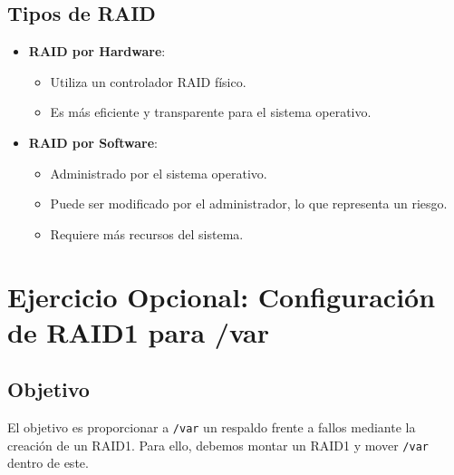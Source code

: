 \subsection{Tipos de RAID}
\begin{itemize}
    \item \textbf{RAID por Hardware}: 
    \begin{itemize}
        \item Utiliza un controlador RAID físico.
        \item Es más eficiente y transparente para el sistema operativo.
    \end{itemize}
    
    \item \textbf{RAID por Software}: 
    \begin{itemize}
        \item Administrado por el sistema operativo.
        \item Puede ser modificado por el administrador, lo que representa un riesgo.
        \item Requiere más recursos del sistema.
    \end{itemize}
\end{itemize}

\section{Ejercicio Opcional: Configuración de RAID1 para /var}

\subsection{Objetivo}
El objetivo es proporcionar a \texttt{/var} un respaldo frente a fallos mediante la creación de un RAID1. Para ello, debemos montar un RAID1 y mover \texttt{/var} dentro de este.

